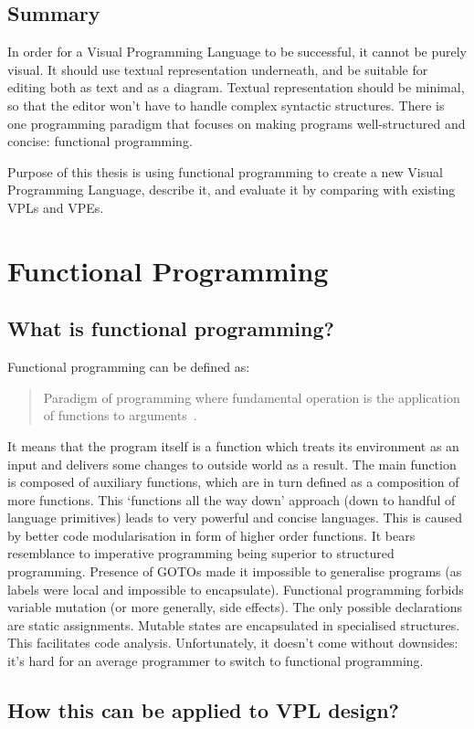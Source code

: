 \documentclass[11pt]{scrartcl}
\begin{document}
\subsection{Summary}
In order for a Visual Programming Language to be successful, it cannot be purely
visual.
It should use textual representation underneath, and be suitable for editing
both as text and as a diagram.
Textual representation should be minimal, so that the editor won’t have  to
handle complex syntactic structures.
There is one programming paradigm that focuses on making programs
well-structured and concise: functional programming.

Purpose of this thesis is using functional programming to create a new Visual
Programming Language, describe it, and evaluate it by comparing with existing
VPLs and VPEs.


\section{Functional Programming}
\subsection{What is functional programming?}
Functional programming can be defined as:
\blockquote{Paradigm of programming where
  fundamental operation is the application of functions to
  arguments~\cite{Hughes:1989:WFP:63410.63411}.}

It means that the program itself is a function which treats its environment as
an input and delivers some changes to outside world as a result.
The main function is composed of auxiliary functions, which are in turn defined
as a composition of more functions.
This ‘functions all the way down’ approach (down to handful of language
primitives) leads to very powerful and concise languages.
This is caused by better code modularisation in form of higher order functions.
It bears resemblance to imperative programming being superior to structured
programming.
Presence of GOTOs made it impossible to generalise programs (as labels were
local and impossible to encapsulate).
Functional programming forbids variable mutation (or more generally, side
effects).
The only possible declarations are static assignments.
Mutable states are encapsulated in specialised structures.
This facilitates code analysis.
Unfortunately, it doesn’t come without downsides: it’s hard for an average
programmer to switch to functional programming.


\subsection{How this can be applied to VPL design?}
\end{document}
